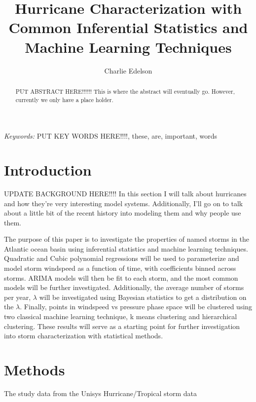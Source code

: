 \documentclass{article}
\title{Hurricane Characterization with Common Inferential Statistics and Machine Learning Techniques}
\author{Charlie Edelson}
\providecommand{\keywords}[1]{\small{\textit{Keywords:} #1}}
\begin{document}
	
	\maketitle

	\begin{abstract}
	PUT ABSTRACT HERE!!!!!! This is where the abstract will eventually go. However, currently we only have a place holder.
	\end{abstract}
	
	\keywords{PUT KEY WORDS HERE!!!!, these, are, important, words}

	\section{Introduction}
	UPDATE BACKGROUND HERE!!!! In this section I will talk about hurricanes and how they're very interesting model systems. Additionally, I'll go on to talk about a little bit of the recent history into modeling them and why people use them.
	
	The purpose of this paper is to investigate the properties of named storms in the Atlantic ocean basin using inferential statistics and machine learning techniques. Quadratic and Cubic polynomial regressions will be used to parameterize and model storm windspeed as a function of time, with coefficients binned across storms. ARIMA models will then be fit to each storm, and the most common models will be further investigated. Additionally, the average number of storms per year, $\lambda$ will be investigated using Bayesian statistics to get a distribution on the $\lambda$. Finally, points in windspeed vs pressure phase space will be clustered using two classical machine learning technique, k means clustering and hierarchical clustering. These results will serve as a starting point for further investigation into storm characterization with statistical methods.

	\section{Methods}
	The study data from the Unisys Hurricane/Tropical storm data\cite{Unisys}


	
	
\end{document}
